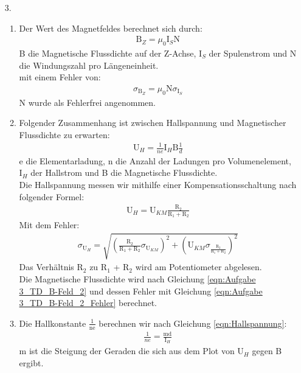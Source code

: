 \documentclass[12pt]{scrartcl}
\begin{document}
\begin{enumerate}
\item[3.]
\begin{enumerate}
\item
Der Wert des Magnetfeldes berechnet sich durch:
\begin{align}
 \text{B}_Z = \mu_0 \text{I}_S \text{N}
 \label{eqn:Aufgabe 3_TD_B-Feld_2}
\end{align}
B die Magnetische Flussdichte auf der Z-Achse, I$_S$ der Spulenstrom und N die Windungszahl pro Längeneinheit.\\
mit einem Fehler von:
\begin{align}
\sigma_{\text{B}_Z} = \mu_0 \text{N} \sigma_{\text{I}_S}
\label{eqn:Aufgabe 3_TD_B-Feld_2_Fehler}
\end{align}
N wurde als Fehlerfrei angenommen.\\
\item
Folgender Zusammenhang ist zwischen Hallspannung und Magnetischer Flussdichte zu erwarten:
\begin{align}
\text{U}_H = \frac{1}{ne} \text{I}_H \text{B} \frac{1}{d}
\label{eqn:Hallspannung}
\end{align}
e die Elementarladung, n die Anzahl der Ladungen pro Volumenelement, I$_H$ der Hallstrom und B die Magnetische Flussdichte.\\
Die Hallspannung messen wir mithilfe einer Kompensationsschaltung nach folgender Formel:
\begin{align}
\text{U}_H = \text{U}_{KM} \frac{\text{R}_2}{\text{R}_1+\text{R}_2}
\label{eqn:U_H}
\end{align}
Mit dem Fehler:
\begin{align}
\sigma_{\text{U}_H} = \sqrt{
\left(\frac{\text{R}_2}{\text{R}_1+\text{R}_2}\sigma_{\text{U}_{KM}}\right)^2+
\left(\text{U}_{KM}\sigma_{\frac{\text{R}_2}{\text{R}_1+\text{R}_2}}\right)^2}
\label{eqn:U_H_Fehler}
\end{align}
Das Verhältnis R$_2$ zu R$_1$ + R$_2$ wird am Potentiometer abgelesen.\\
Die Magnetische Flussdichte wird nach Gleichung \ref{eqn:Aufgabe 3_TD_B-Feld_2} und dessen Fehler mit Gleichung \ref{eqn:Aufgabe 3_TD_B-Feld_2_Fehler} berechnet.
\item
Die Hallkonstante $\frac{1}{\text{ne}}$ berechnen wir nach Gleichung \ref{eqn:Hallspannung}:
\begin{align}
\frac{1}{ne} = \frac{\text{m} \text{d}}
{\text{I}_H}
\label{eqn:Hallkonstante}
\end{align}
m ist die Steigung der Geraden die sich aus dem Plot von U$_H$ gegen B ergibt.\\

\end{enumerate}
\end{enumerate}
\end{document}
